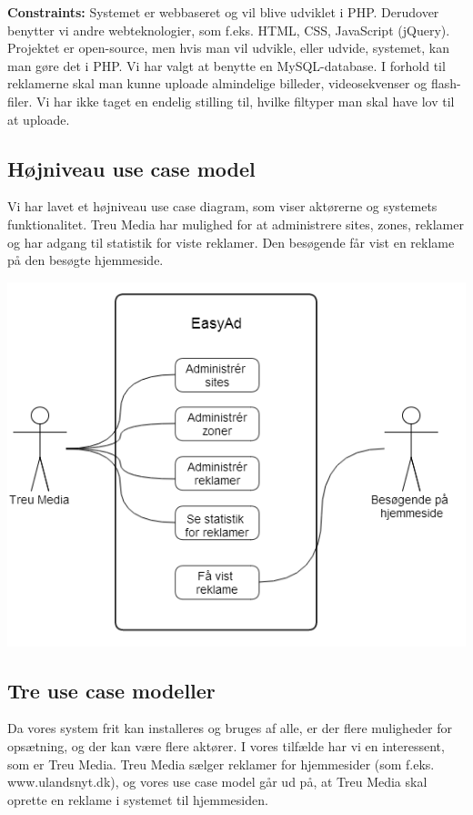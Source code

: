 \documentclass[a4paper,12pt]{article}
\begin{document}
\textbf{Constraints:} Systemet er webbaseret og vil blive udviklet i PHP. Derudover benytter vi andre webteknologier, som f.eks. HTML, CSS, JavaScript (jQuery). Projektet er open-source, men hvis man vil udvikle, eller udvide, systemet, kan man gøre det i PHP. Vi har valgt at benytte en MySQL-database. I forhold til reklamerne skal man kunne uploade almindelige billeder, videosekvenser og flash-filer. Vi har ikke taget en endelig stilling til, hvilke filtyper man skal have lov til at uploade.

\subsection{Højniveau use case model}
Vi har lavet et højniveau use case diagram, som viser aktørerne og systemets funktionalitet. Treu Media har mulighed for at administrere sites, zones, reklamer og har adgang til statistik for viste reklamer. Den besøgende får vist en reklame på den besøgte hjemmeside.

\centerline{\includegraphics[scale=0.5]{hojniveau_diagram}}

\subsection{Tre use case modeller}
Da vores system frit kan installeres og bruges af alle, er der flere muligheder for opsætning, og der kan være flere aktører. I vores tilfælde har vi en interessent, som er Treu Media. Treu Media sælger reklamer for hjemmesider (som f.eks. www.ulandsnyt.dk), og vores use case model går ud på, at Treu Media skal oprette en reklame i systemet til hjemmesiden.
\end{document}
